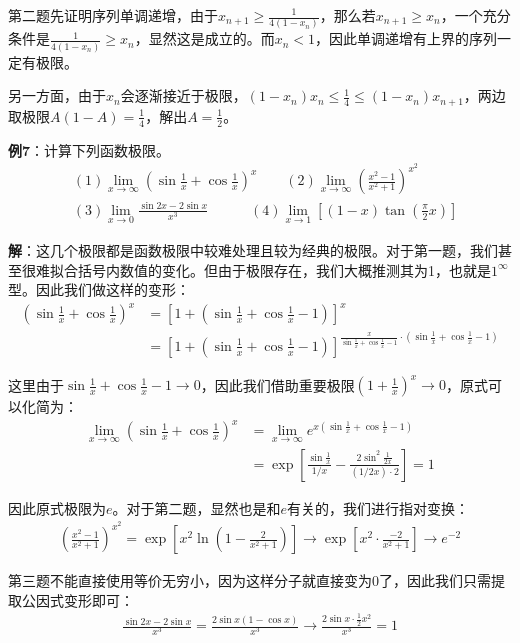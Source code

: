 \documentclass{ctexart}
\let\oldtextbf\textbf %
\renewcommand{\textbf}[1]{\textcolor{btex}{\oldtextbf{#1}}} %
\begin{document}
第二题先证明序列单调递增，由于$x_{n+1}\geq\frac{1}{4(1-x_n)}$，那么若$x_{n+1}\geq x_n$，一个充分条件是$\frac{1}{4(1-x_n)}\geq x_n$，显然这是成立的。而$x_{n}<1$，因此单调递增有上界的序列一定有极限。

另一方面，由于$x_n$会逐渐接近于极限，$(1-x_n)x_n\leq\frac{1}{4}\leq (1-x_{n})x_{n+1}$，两边取极限$A(1-A)=\frac{1}{4}$，解出$A=\frac{1}{2}$。

\textbf{例7}：计算下列函数极限。
\begin{align*}
&(1) \lim_{x\to\infty}(\sin \frac{1}{x}+\cos\frac{1}{x})^x \qquad (2)\lim_{x\to\infty}\left(
\frac{x^2-1}{x^2+1} \right)^{x^2}\\
&(3)\lim_{x\to 0}\frac{\sin 2x-2\sin x}{x^3}\qquad \quad(4)\lim_{x\to 1}[(1-x)\tan(\frac{\pi}{2}x)]
\end{align*}

\textbf{解}：这几个极限都是函数极限中较难处理且较为经典的极限。对于第一题，我们甚至很难拟合括号内数值的变化。但由于极限存在，我们大概推测其为1，也就是$1^\infty$型。因此我们做这样的变形：
\begin{align*}
    (\sin \frac{1}{x}+\cos\frac{1}{x})^x&=
    [1+(\sin \frac{1}{x}+\cos\frac{1}{x}-1)]^x\\
    &=[1+(\sin \frac{1}{x}+\cos\frac{1}{x}-1)]^{\frac{x}{\sin \frac{1}{x}+\cos\frac{1}{x}-1}\cdot (\sin \frac{1}{x}+\cos\frac{1}{x}-1)}
\end{align*}

这里由于$\sin\frac{1}{x}+\cos\frac{1}{x}-1\to 0$，因此我们借助重要极限$(1+\frac{1}{x})^x\to 0$，原式可以化简为：
\begin{align*}
    \lim_{x\to\infty}(\sin \frac{1}{x}+\cos\frac{1}{x})^x&=\lim_{x\to\infty}e^{x(\sin\frac{1}{x}+\cos\frac{1}{x}-1)}\\
    &=\exp\left[\frac{\sin \frac{1}{x}}{1/x}-\frac{2\sin^2\frac{1}{2x}}{(1/2x)\cdot 2}\right]=1
\end{align*}

因此原式极限为$e$。对于第二题，显然也是和$e$有关的，我们进行指对变换：
\begin{align*}
   \left(
\frac{x^2-1}{x^2+1} \right)^{x^2}=\exp\left[x^2\ln(1-\frac{2}{x^2+1})\right]\to \exp[x^2\cdot\frac{-2}{x^2+1}]\to e^{-2} 
\end{align*}

第三题不能直接使用等价无穷小，因为这样分子就直接变为0了，因此我们只需提取公因式变形即可：
\begin{align*}
  \frac{\sin 2x-2\sin x}{x^3}=\frac{2\sin x(1-\cos x)}{x^3}\to\frac{2\sin x\cdot\frac{1}{2}x^2}{x^3}=1  
\end{align*}
\end{document}
